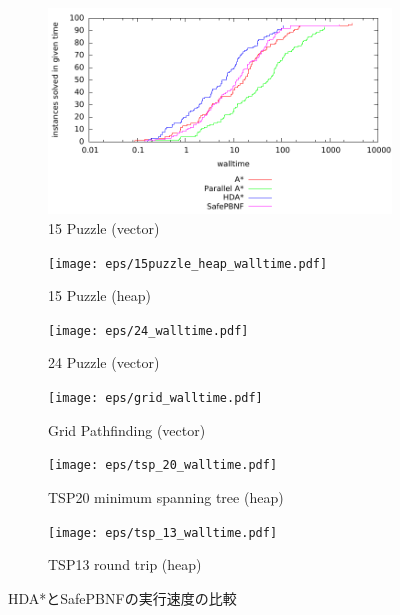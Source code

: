 \documentclass{jsarticle}
\begin{document}
\begin{figure}
	\begin{subfigure}{0.4\columnwidth}
		\includegraphics[width=\columnwidth]{eps/15puzzle_vector_walltime.pdf}
		\caption{15 Puzzle (vector)}
		\label{fig:15puzzle_vector}
	\end{subfigure}
	\begin{subfigure}{0.4\columnwidth}
		\texttt{[image: eps/15puzzle\_heap\_walltime.pdf]}
		\caption{15 Puzzle (heap)}
		\label{fig:15puzzle_heap}
	\end{subfigure}
	\begin{subfigure}{0.4\columnwidth}
		\texttt{[image: eps/24\_walltime.pdf]}
		\caption{24 Puzzle (vector)}
		\label{fig:24puzzle_vector}
	\end{subfigure}
	\begin{subfigure}{0.4\columnwidth}
		\texttt{[image: eps/grid\_walltime.pdf]}
		\caption{Grid Pathfinding (vector)}
		\label{fig:grid}
	\end{subfigure}
	\begin{subfigure}{0.4\columnwidth}
		\texttt{[image: eps/tsp\_20\_walltime.pdf]}
		\caption{TSP20 minimum spanning tree (heap)}
		\label{fig:tsp_20_mst}
	\end{subfigure}
	\begin{subfigure}{0.4\columnwidth}
		\texttt{[image: eps/tsp\_13\_walltime.pdf]}
		\caption{TSP13 round trip (heap)}
		\label{fig:tsp_13}
	\end{subfigure}

	\caption{HDA*とSafePBNFの実行速度の比較}
	\label{fig:comparison}
\end{figure}%
\end{document}
